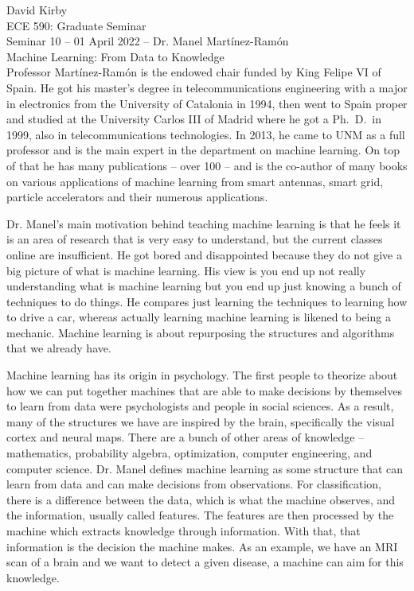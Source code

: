\documentclass[11pt]{article}
\begin{document}
\setmainfont{Times New Roman}
\setsansfont{Times New Roman}
\setmonofont{Times New Roman}
\renewcommand{\familydefault}{\sfdefault}

\hypersetup{
    linkcolor=CrispBlue,
    urlcolor=CrispBlue,
    breaklinks=true
}

\noindent David Kirby\\
ECE 590: Graduate Seminar\\
Seminar 10 -- 01 April 2022 -- Dr. Manel Mart\'inez-Ram\'on\\
Machine Learning: From Data to Knowledge\\

Professor Mart\'inez-Ram\'on is the endowed chair funded by King Felipe VI of Spain. He got his master's degree in telecommunications engineering with a major in electronics from the University of Catalonia in 1994, then went to Spain proper and studied at the University Carlos III of Madrid where he got a Ph.~D.~in 1999, also in telecommunications technologies. In 2013, he came to UNM as a full professor and is the main expert in the department on machine learning. On top of that he has many publications -- over 100 -- and is the co-author of many books on various applications of machine learning from smart antennas, smart grid, particle accelerators and their numerous applications.

Dr. Manel's main motivation behind teaching machine learning is that he feels it is an area of research that is very easy to understand, but the current classes online are insufficient. He got bored and disappointed because they do not give a big picture of what is machine learning. His view is you end up not really understanding what is machine learning but you end up just knowing a bunch of techniques to do things. He compares just learning the techniques to learning how to drive a car, whereas actually learning machine learning is likened to being a mechanic. Machine learning is about repurposing the structures and algorithms that we already have.

Machine learning has its origin in psychology. The first people to theorize about how we can put together machines that are able to make decisions by themselves to learn from data were psychologists and people in social sciences. As a result, many of the structures we have are inspired by the brain, specifically the visual cortex and neural maps. There are a bunch of other areas of knowledge --  mathematics, probability algebra, optimization, computer engineering, and computer science. Dr. Manel defines machine learning as some structure that can learn from data and can make decisions from observations. For classification, there is a difference between the data, which is what the machine observes, and the information, usually called features. The features are then processed by the machine which extracts knowledge through information. With that, that information is the decision the machine makes. As an example, we have an MRI scan of a brain and we want to detect a given disease, a machine can aim for this knowledge.
\end{document}
